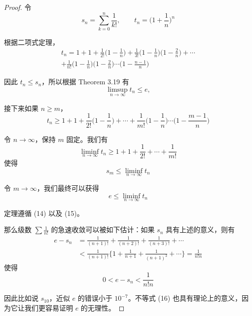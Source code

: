 \documentclass[../poma-notes.tex]{subfiles}
\begin{document}
\begin{proof}
  令
  \[ s_n = \sum_{k=0}^{n} \frac{1}{k!}, \qquad t_n = \Biggl( 1 + \frac{1}{n} \Biggr)^n \]

  根据二项式定理，
  \begin{multline*}
    t_n = 1+1+\frac{1}{2!}\Biggl(1-\frac{1}{n}\Biggr)+\frac{1}{3!}\Biggl(1-\frac{1}{n}\Biggr)\Biggl(1-\frac{2}{n}\Biggr)+\cdots \\
    + \frac{1}{n!}\Biggl(1-\frac{1}{n}\Biggr)\Biggl(1-\frac{2}{n}\Biggr)\cdots\Biggl(1-\frac{n-1}{n}\Biggr)
  \end{multline*}

  因此 $t_n \le s_n$，所以根据 Theorem 3.19 有
  \begin{equation}
    \limsup_{n \to \infty} t_n \le e,
  \end{equation}

  接下来如果 $n \ge m$，
  \[
    t_n \ge 1 + 1 + \frac{1}{2!}\Biggl(1-\frac{1}{n}\Biggr) + \cdots
    + \frac{1}{m!}\Biggl(1-\frac{1}{n}\Biggr) \cdots \Biggl(1-\frac{m-1}{n}\Biggr)
  \]

  令 $n \to \infty$，保持 $m$ 固定。我们有
  \[ \liminf_{n \to \infty} t_n \ge 1 + 1 + \frac{1}{2!} + \cdots + \frac{1}{m!} \]
  使得
  \[ s_m \le \liminf_{n \to \infty} t_n \]

  令 $m \to \infty$，我们最终可以获得
  \begin{equation}
    e \le \liminf_{n \to \infty} t_n
  \end{equation}

  定理遵循 (14) 以及 (15)。

  那么级数 $\sum \frac{1}{n!}$ 的急速收敛可以被如下估计：如果 $s_n$ 具有上述的意义，则有
  \begin{align*}
    \mathcal{} e - s_n & = \frac{1}{(n+1)!} + \frac{1}{(n+2)!} + \frac{1}{(n+3)!} + \cdots                          \\
                       & < \frac{1}{(n+1)!}\Biggl\{1+\frac{1}{n+1}+\frac{1}{(n+1)^2}+\cdots\Biggr\} = \frac{1}{n!n}
  \end{align*}
  使得
  \begin{equation}
    0 < e - s_n < \frac{1}{n!n}
  \end{equation}

  因此比如说 $s_{10}$，近似 $e$ 的错误小于 $10^{-7}$。不等式 (16) 也具有理论上的意义，因为它让我们更容易证明 $e$ 的无理性。
\end{proof}

\end{document}
